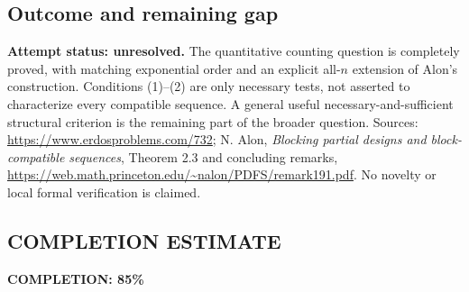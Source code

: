 \subsection*{Outcome and remaining gap}
\textbf{Attempt status: unresolved.} The quantitative counting question is completely proved, with matching exponential order and an explicit all-$n$ extension of Alon's construction. Conditions (1)--(2) are only necessary tests, not asserted to characterize every compatible sequence. A general useful necessary-and-sufficient structural criterion is the remaining part of the broader question.
Sources: \url{https://www.erdosproblems.com/732}; N. Alon, \emph{Blocking partial designs and block-compatible sequences}, Theorem 2.3 and concluding remarks, \url{https://web.math.princeton.edu/~nalon/PDFS/remark191.pdf}. No novelty or local formal verification is claimed.

\subsection*{COMPLETION ESTIMATE}
\textbf{COMPLETION: 85\%}

